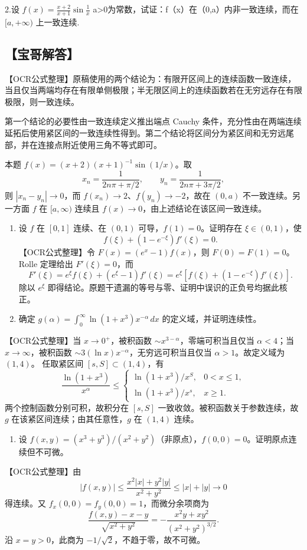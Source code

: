 \documentclass[11pt,fontset=fandol]{ctexart}
\providecommand{\tightlist}{\setlength{\itemsep}{0pt}\setlength{\parskip}{0pt}}
\begin{document}
2.设
\(f ( x ) = { \frac { x + 2 } { x + 1 } } \sin { \frac { 1 } { x } }\)
a\textgreater0为常数，试证：f（x）在（0,a）内非一致连续，而在\([ a , + \infty )\)
上一致连续.

\subsection{【宝哥解答】}\label{ux5b9dux54e5ux89e3ux7b54-5}

【OCR公式整理】原稿使用的两个结论为：有限开区间上的连续函数一致连续，当且仅当两端均存在有限单侧极限；半无限区间上的连续函数若在无穷远存在有限极限，则一致连续。

第一个结论的必要性由一致连续定义推出端点 Cauchy
条件，充分性由在两端连续延拓后使用紧区间的一致连续性得到。第二个结论将区间分为紧区间和无穷远尾部，并在连接点附近使用三角不等式即可。

本题 \(f(x)=(x+2)(x+1)^{-1}\sin(1/x)\)。取 \[
x_n=\frac1{2n\pi+\pi/2},\qquad y_n=\frac1{2n\pi+3\pi/2},
\] 则 \(|x_n-y_n|\to0\)，而 \(f(x_n)\to2\)、\(f(y_n)\to-2\)，故在
\((0,a)\) 不一致连续。另一方面 \(f\) 在 \([a,\infty)\) 连续且
\(f(x)\to0\)，由上述结论在该区间一致连续。

\begin{enumerate}
\def\labelenumi{\arabic{enumi}.}
\setcounter{enumi}{2}
\item
  设 \(f\) 在 \([0,1]\) 连续、在 \((0,1)\) 可导，\(f(1)=0\)。证明存在
  \(\xi\in(0,1)\)，使 \[
  f(\xi)+(1-e^{-\xi})f'(\xi)=0.
  \] 【OCR公式整理】令 \(F(x)=(e^x-1)f(x)\)，则 \(F(0)=F(1)=0\)。Rolle
  定理给出 \(F'(\xi)=0\)，而 \[
  F'(\xi)=e^\xi f(\xi)+(e^\xi-1)f'(\xi)
  =e^\xi[f(\xi)+(1-e^{-\xi})f'(\xi)].
  \] 除以 \(e^\xi\)
  即得结论。原题干遗漏的等号与零、证明中误识的正负号均据此核正。
\item
  确定 \(g(\alpha)=\int_0^\infty\ln(1+x^3)x^{-\alpha}\,dx\)
  的定义域，并证明连续性。
\end{enumerate}

【OCR公式整理】当 \(x\to0^+\)，被积函数
\(\sim x^{3-\alpha}\)，零端可积当且仅当 \(\alpha<4\)；当
\(x\to\infty\)，被积函数 \(\sim3(\ln x)x^{-\alpha}\)，无穷远可积当且仅当
\(\alpha>1\)。故定义域为 \((1,4)\)。 任取紧区间
\([s,S]\subset(1,4)\)，有 \[
\frac{\ln(1+x^3)}{x^\alpha}\le
\begin{cases}
\ln(1+x^3)/x^S,&0<x\le1,\\
\ln(1+x^3)/x^s,&x\ge1.
\end{cases}
\] 两个控制函数分别可积，故积分在 \([s,S]\)
一致收敛。被积函数关于参数连续，故 \(g\)
在该紧区间连续；由其任意性，\(g\) 在 \((1,4)\) 连续。

\begin{enumerate}
\def\labelenumi{\arabic{enumi}.}
\setcounter{enumi}{4}
\tightlist
\item
  设
  \(f(x,y)=(x^3+y^3)/(x^2+y^2)\)（非原点），\(f(0,0)=0\)。证明原点连续但不可微。
\end{enumerate}

【OCR公式整理】由 \[
|f(x,y)|\le\frac{x^2|x|+y^2|y|}{x^2+y^2}\le|x|+|y|\to0
\] 得连续。又 \(f_x(0,0)=f_y(0,0)=1\)，而微分余项商为 \[
\frac{f(x,y)-x-y}{\sqrt{x^2+y^2}}
=-\frac{x^2y+xy^2}{(x^2+y^2)^{3/2}}.
\] 沿 \(x=y>0\)，此商为 \(-1/\sqrt2\)，不趋于零，故不可微。
\end{document}
